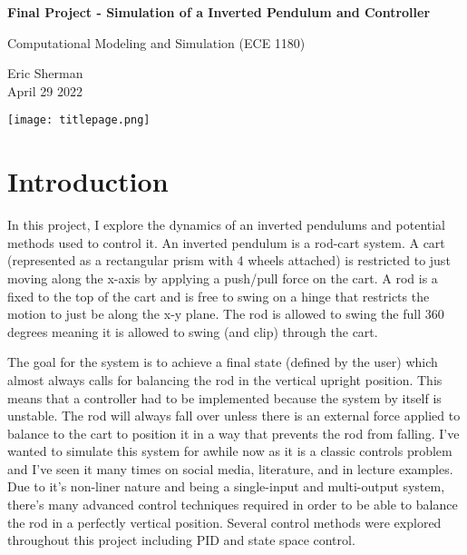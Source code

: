 \documentclass{article}
\begin{document}
\begin{titlepage}
    \begin{center}
        \vspace*{1cm}
            
        \LARGE
        \textbf{Final Project - Simulation of a Inverted Pendulum and Controller}
            
        \vspace{0.5cm}
        \Large
        Computational Modeling and Simulation (ECE 1180)
        
            
        \vspace{0.5cm}
        \large
        Eric Sherman \\
        April 29 2022
        
        \vspace{3cm}
        \texttt{[image: titlepage.png]}
            
        \vfill
        
    \end{center}
\end{titlepage}


\section{Introduction}

In this project, I explore the dynamics of an inverted pendulums and potential methods used to control it. An inverted pendulum is a rod-cart system. A cart (represented as a rectangular prism with 4 wheels attached) is restricted to just moving along the x-axis by applying a push/pull force on the cart. A rod is a fixed to the top of the cart and is free to swing on a hinge that restricts the motion to just be along the x-y plane. The rod is allowed to swing the full 360 degrees meaning it is allowed to swing (and clip) through the cart.

The goal for the system is to achieve a final state (defined by the user) which almost always calls for balancing the rod in the vertical upright position. This means that a controller had to be implemented because the system by itself is unstable. The rod will always fall over unless there is an external force applied to balance to the cart to position it in a way that prevents the rod from falling. I've wanted to simulate this system for awhile now as it is a classic controls problem and I've seen it many times on social media, literature, and in lecture examples. Due to it's non-liner nature and being a single-input and multi-output system, there's many advanced control techniques required in order to be able to balance the rod in a perfectly vertical position. Several control methods were explored throughout this project including PID and state space control. 
\end{document}
